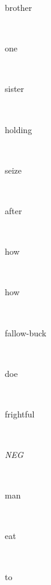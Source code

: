 \documentclass[a4paper]{article}
\begin{document}
\begin{multicols}{4}
\begin{multicols}{4}
\begin{multicols}{5}
{\hebrewfont{}} \begin{english}brother\end{english}\\
{\hebrewfont{}} \begin{english}one\end{english}\\
{\hebrewfont{}} \begin{english}sister\end{english}\\
{\hebrewfont{}} \begin{english}holding\end{english}\\
{\hebrewfont{}} \begin{english}seize\end{english}\\
{\hebrewfont{}} \begin{english}after\end{english}\\
{\hebrewfont{}} \begin{english}how\end{english}\\
{\hebrewfont{}} \begin{english}how\end{english}\\
{\hebrewfont{}} \begin{english}fallow-buck\end{english}\\
{\hebrewfont{}} \begin{english}doe\end{english}\\
{\hebrewfont{}} \begin{english}frightful\end{english}\\
{\hebrewfont{}} \begin{english}\textit{NEG}\end{english}\\
{\hebrewfont{}} \begin{english}man\end{english}\\
{\hebrewfont{}} \begin{english}eat\end{english}\\
{\hebrewfont{}} \begin{english}to\end{english}\\

\end{multicols}
\end{multicols}
\end{multicols}
\end{document}
